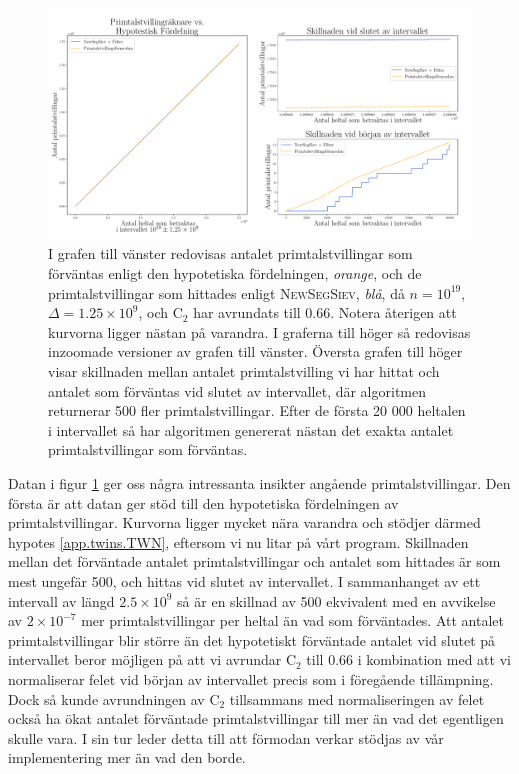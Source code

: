 \begin{figure}[h]
    \centering
    \includegraphics[width = \textwidth]{coen/Images/TwinPrimesNoKapp.pdf}
    \caption{I grafen till vänster redovisas antalet primtalstvillingar som förväntas enligt den hypotetiska fördelningen, \textit{orange}, och de primtalstvillingar som hittades enligt \textsc{NewSegSiev}, \textit{blå}, då \(n = 10^{19}\), \(\Delta = 1.25\times10^9\), och \(\text{C}_2\) har avrundats till 0.66. Notera återigen att kurvorna ligger nästan på varandra. I graferna till höger så redovisas inzoomade versioner av grafen till vänster. 
    Översta grafen till höger visar skillnaden mellan antalet primtalstvilling vi har hittat och antalet som förväntas vid slutet av intervallet, där algoritmen returnerar 500 fler primtalstvillingar. Efter de första 20 000 heltalen i intervallet så har algoritmen genererat nästan det exakta antalet primtalstvillingar som förväntas.}
    \label{fig:res.twins}
\end{figure}

Datan i figur \ref{fig:res.twins} ger oss några intressanta insikter angående primtalstvillingar. 
Den första är att datan ger stöd till den hypotetiska fördelningen av primtalstvillingar. 
Kurvorna ligger mycket nära varandra och stödjer därmed hypotes \ref{app.twins.TWN}, eftersom vi nu litar på vårt program.
Skillnaden mellan det förväntade antalet primtalstvillingar och antalet som hittades är som mest ungefär 500, och hittas vid slutet av intervallet.
I sammanhanget av ett intervall av längd \(2.5\times10^9\) så är en skillnad av 500 ekvivalent med en avvikelse av \(2\times 10^{-7}\) mer primtalstvillingar per heltal än vad som förväntades.
Att antalet primtalstvillingar blir större än det hypotetiskt förväntade antalet vid slutet på intervallet beror möjligen på att vi avrundar \(\text{C}_2\) till 0.66 i kombination med att vi normaliserar felet vid början av intervallet precis som i föregående tillämpning.
Dock så kunde avrundningen av \(\text{C}_2\) tillsammans med normaliseringen av felet också ha ökat antalet förväntade primtalstvillingar till mer än vad det egentligen skulle vara. 
I sin tur leder detta till att förmodan verkar stödjas av vår implementering mer än vad den borde.

